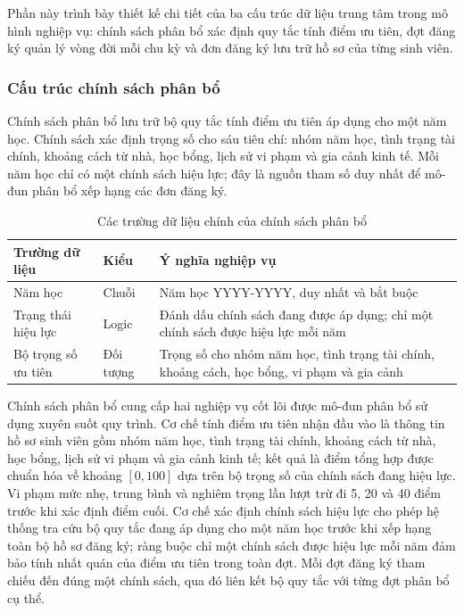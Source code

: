 \documentclass[../DoAn.tex]{subfiles}
\begin{document}
Phần này trình bày thiết kế chi tiết của ba cấu trúc dữ liệu trung tâm trong
mô hình nghiệp vụ: chính sách phân bổ xác định quy tắc tính điểm ưu tiên, đợt
đăng ký quản lý vòng đời mỗi chu kỳ và đơn đăng ký lưu trữ hồ sơ của từng
sinh viên.

\subsubsection{Cấu trúc chính sách phân bổ}

Chính sách phân bổ lưu trữ bộ quy tắc tính điểm ưu tiên áp dụng cho một năm
học. Chính sách xác định trọng số cho sáu tiêu chí: nhóm năm học, tình trạng
tài chính, khoảng cách từ nhà, học bổng, lịch sử vi phạm và gia cảnh kinh tế.
Mỗi năm học chỉ có một chính sách hiệu lực; đây là nguồn tham số duy nhất để
mô-đun phân bổ xếp hạng các đơn đăng ký.

\vspace{-6pt}
\begin{table}[H]
\centering
\caption{Các trường dữ liệu chính của chính sách phân bổ}
\label{tab:class_policy_attr}
\small
\begin{tabular}{|>{\raggedright\arraybackslash}p{3.6cm}|>{\raggedright\arraybackslash}p{2.8cm}|>{\raggedright\arraybackslash}p{7.0cm}|}
\hline
\textbf{Trường dữ liệu} & \textbf{Kiểu} & \textbf{Ý nghĩa nghiệp vụ} \\
\hline
Năm học & Chuỗi & Năm học YYYY-YYYY, duy nhất và bắt buộc \\
\hline
Trạng thái hiệu lực & Logic & Đánh dấu chính sách đang được áp dụng; chỉ một chính sách được hiệu lực mỗi năm \\
\hline
Bộ trọng số ưu tiên & Đối tượng & Trọng số cho nhóm năm học, tình trạng tài chính, khoảng cách, học bổng, vi phạm và gia cảnh \\
\hline
\end{tabular}
\end{table}
\vspace{-4pt}

Chính sách phân bổ cung cấp hai nghiệp vụ cốt lõi được mô-đun phân bổ sử dụng
xuyên suốt quy trình. Cơ chế tính điểm ưu tiên nhận đầu vào là thông tin hồ sơ
sinh viên gồm nhóm năm học, tình trạng tài chính, khoảng cách từ nhà, học bổng,
lịch sử vi phạm và gia cảnh kinh tế; kết quả là điểm tổng hợp được chuẩn hóa
về khoảng $[0, 100]$ dựa trên bộ trọng số của chính sách đang hiệu lực. Vi phạm
mức nhẹ, trung bình và nghiêm trọng lần lượt trừ đi 5, 20 và 40 điểm trước khi
xác định điểm cuối. Cơ chế xác định chính sách hiệu lực cho phép hệ thống tra
cứu bộ quy tắc đang áp dụng cho một năm học trước khi xếp hạng toàn bộ hồ sơ
đăng ký; ràng buộc chỉ một chính sách được hiệu lực mỗi năm đảm bảo tính nhất
quán của điểm ưu tiên trong toàn đợt. Mỗi đợt đăng ký tham chiếu đến đúng một
chính sách, qua đó liên kết bộ quy tắc với từng đợt phân bổ cụ thể.
\end{document}

